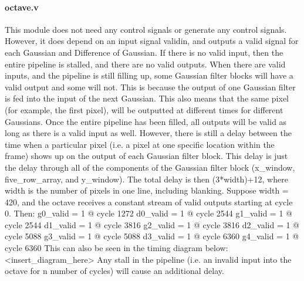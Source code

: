 \documentclass[12pt]{article}
\begin{document}
\paragraph{octave.v}
This module does not need any control signals or generate any control signals. 
However, it does depend on an input signal validin, and outputs a valid signal 
for each Gaussian and Difference of Gaussian. If there is no valid input, then 
the entire pipeline is stalled, and there are no valid outputs. When there are 
valid inputs, and the pipeline is still filling up, some Gaussian filter blocks 
will have a valid output and some will not. This is because the output of one 
Gaussian filter is fed into the input of the next Gaussian. This also means that 
the same pixel (for example, the first pixel), will be outputted at different 
times for different Gaussians. Once the entire pipeline has been filled, all 
outputs will be valid as long as there is a valid input as well. However, there 
is still a delay between the time when a particular pixel (i.e. a pixel at one 
specific location within the frame) shows up on the output of each Gaussian 
filter block. This delay is just the delay through all of the components of the 
Gaussian filter block (x\_window, five\_row\_array, and y\_window). The total delay 
is then (3*width)+12, where width is the number of pixels in one line, including 
blanking. Suppose width = 420, and the octave receives a constant stream of 
valid outputs starting at cycle 0. Then:
g0\_valid = 1 @ cycle 1272
d0\_valid = 1 @ cycle 2544
g1\_valid = 1 @ cycle 2544
d1\_valid = 1 @ cycle 3816
g2\_valid = 1 @ cycle 3816
d2\_valid = 1 @ cycle 5088
g3\_valid = 1 @ cycle 5088
d3\_valid = 1 @ cycle 6360
g4\_valid = 1 @ cycle 6360
This can also be seen in the timing diagram below: <insert\_diagram\_here>
Any stall in the pipeline (i.e. an invalid input into the octave for n number of 
cycles) will cause an additional delay.
\end{document}

